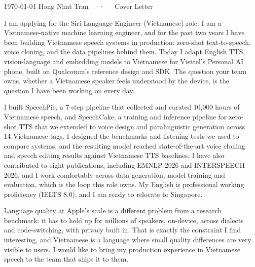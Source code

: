 \documentclass[11pt, a4paper]{awesome-cv}
\begin{document}
\makecvheader[C]

\makecvfooter
  {\today}
  {Hong Nhat Tran~~~·~~~Cover Letter}
  {}

\makelettertitle


\begin{cvletter}

I am applying for the Siri Language Engineer (Vietnamese) role. I am a Vietnamese-native machine learning engineer, and for the past two years I have been building Vietnamese speech systems in production: zero-shot text-to-speech, voice cloning, and the data pipelines behind them. Today I adapt English TTS, vision-language and embedding models to Vietnamese for Viettel's Personal AI phone, built on Qualcomm's reference design and SDK. The question your team owns, whether a Vietnamese speaker feels understood by the device, is the question I have been working on every day.

I built SpeechPie, a 7-step pipeline that collected and curated 10,000 hours of Vietnamese speech, and SpeechCake, a training and inference pipeline for zero-shot TTS that we extended to voice design and paralinguistic generation across 14 Vietnamese tags. I designed the benchmarks and listening tests we used to compare systems, and the resulting model reached state-of-the-art voice cloning and speech editing results against Vietnamese TTS baselines. I have also contributed to eight publications, including EMNLP 2026 and INTERSPEECH 2026, and I work comfortably across data generation, model training and evaluation, which is the loop this role owns. My English is professional working proficiency (IELTS 8.0), and I am ready to relocate to Singapore.

Language quality at Apple's scale is a different problem from a research benchmark: it has to hold up for millions of speakers, on-device, across dialects and code-switching, with privacy built in. That is exactly the constraint I find interesting, and Vietnamese is a language where small quality differences are very visible to users. I would like to bring my production experience in Vietnamese speech to the team that ships it to them.

\end{cvletter}


\makeletterclosing
\end{document}

